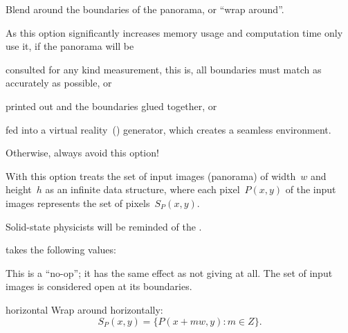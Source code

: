 \begin{codelist}
  \label{opt:wrap}%
\item[\itempar{-w \optional{\metavar{MODE}} \\ --wrap\optional{=\metavar{MODE}}}]\itemend
  Blend around the boundaries of the panorama, or ``wrap around''.

  As this option significantly increases memory usage and computation time only use it, if the
  panorama will be

  \begin{compactitemize}
  \item
    consulted for any kind measurement, this is, all boundaries must match as accurately as
    possible, or

  \item
    printed out and the boundaries glued together, or

  \item
    fed into a virtual reality~() generator, which creates a seamless environment.
  \end{compactitemize}

  \noindent Otherwise, always avoid this option!

  With this option \App{} treats the set of input images (panorama) of width~$w$ and height~$h$
  as an infinite data structure, where each pixel~$P(x, y)$ of the input images represents the
  set of pixels~$S_P(x, y)$.

  \begin{geeknote}
    Solid-state physicists will be reminded of the
    .
  \end{geeknote}

   takes the following values:

  \begin{codelist}
  \item[\itempar{none \\ open}]\itemend
    This is a ``no-op''; it has the same effect as not giving  at all.  The set
    of input images is considered open at its boundaries.

  \item[horizontal]\itemend
    Wrap around horizontally:
    \[
    S_P(x, y) = \{P(x + m w, y): m \in Z\}.
    \]


\end{codelist}
\end{codelist}
